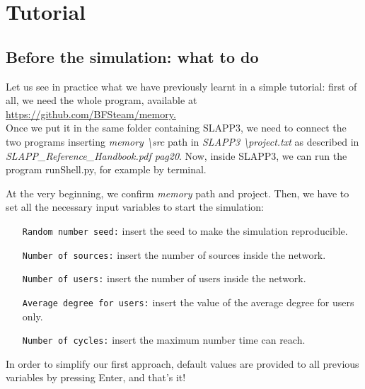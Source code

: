 \section{Tutorial}\label{sec:tutorial}
\subsection{Before the simulation: what to do}\label{subsec:before}
Let us see in practice what we have previously learnt in a simple tutorial: first of all, we need the whole program, available at \url{https://github.com/BFSteam/memory.}\\
Once we put it in the same folder containing SLAPP3, we need to connect the two programs inserting \textit{memory \textbackslash src} path in \textit{SLAPP3 \textbackslash project.txt} as described in 
\\ \textit{SLAPP\_Reference\_Handbook.pdf pag20}.
Now, inside SLAPP3, we can run the program runShell.py, for example by terminal.

At the very beginning, we confirm \textit{memory} path and project. Then, we have to set all the necessary input variables to start the simulation:
\begin{itemize}
\item[\texttt{Random number seed:}] insert the seed to make the simulation reproducible.
\item[\texttt{Number of sources:}]insert the number of sources inside the network.
\item[\texttt{Number of users:}]insert the number of users inside the network.
\item[\texttt{Average degree for users:}]insert the value of the average degree for users only.
\item[\texttt{Number of cycles:}]insert the maximum number time can reach.
\end{itemize}

In order to simplify our first approach, default values are provided to all previous variables by pressing Enter, and that's it!\\

